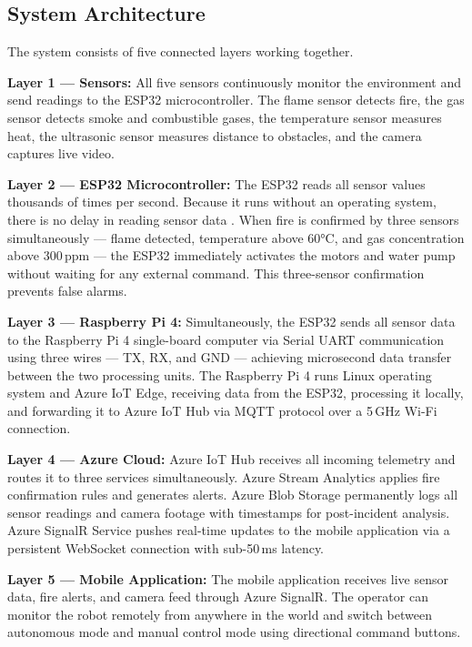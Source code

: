 \documentclass[conference]{IEEEtran}
\begin{document}
\subsection{System Architecture}

The system consists of five connected layers working 
together.

\textbf{Layer 1 — Sensors:}
All five sensors continuously monitor the environment and 
send readings to the ESP32 microcontroller. The flame sensor 
detects fire, the gas sensor detects smoke and combustible 
gases, the temperature sensor measures heat, the ultrasonic 
sensor measures distance to obstacles, and the camera 
captures live video.

\textbf{Layer 2 — ESP32 Microcontroller:}
The ESP32 reads all sensor values thousands of times per 
second. Because it runs without an operating system, there 
is no delay in reading sensor data . When fire 
is confirmed by three sensors simultaneously — flame 
detected, temperature above 60°C, and gas concentration 
above 300\,ppm — the ESP32 immediately activates the motors 
and water pump without waiting for any external command. 
This three-sensor confirmation prevents false alarms.

\textbf{Layer 3 — Raspberry Pi 4:}
Simultaneously, the ESP32 sends all sensor data to the 
Raspberry Pi 4 single-board computer via Serial UART 
communication using three wires — TX, RX, and GND — 
achieving microsecond data transfer between the two 
processing units. The Raspberry Pi 4 runs Linux operating 
system and Azure IoT Edge, receiving data from the ESP32, 
processing it locally, and forwarding it to Azure IoT Hub 
via MQTT protocol over a 5\,GHz Wi-Fi connection.

\textbf{Layer 4 — Azure Cloud:}
Azure IoT Hub receives all incoming telemetry and routes it 
to three services simultaneously. Azure Stream Analytics 
applies fire confirmation rules and generates alerts. Azure 
Blob Storage permanently logs all sensor readings and camera 
footage with timestamps for post-incident analysis. Azure 
SignalR Service pushes real-time updates to the mobile 
application via a persistent WebSocket connection with 
sub-50\,ms latency.

\textbf{Layer 5 — Mobile Application:}
The mobile application receives live sensor data, fire 
alerts, and camera feed through Azure SignalR. The operator 
can monitor the robot remotely from anywhere in the world 
and switch between autonomous mode and manual control mode 
using directional command buttons.
\end{document}
